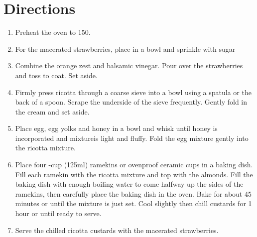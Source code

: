 \section*{Directions}
\begin{enumerate}
	\item Preheat the oven to 150\textcelsius.
	\item  For the macerated strawberries, place in a bowl and sprinkle with sugar
	\item Combine the orange zest and balsamic vinegar. Pour over the strawberries and toss to coat. Set aside.
	\item Firmly press ricotta through a coarse sieve into a bowl using a spatula or the back of a spoon.
		Scrape the underside of the sieve frequently. Gently fold in the cream and set aside.
	\item Place egg, egg yolks and honey in a bowl and whisk until honey is incorporated and mixtureis light and fluffy.
			Fold the egg mixture gently into the ricotta mixture.
	\item Place four -cup (125ml) ramekins or ovenproof ceramic cups in a baking dish.
			Fill each ramekin with the ricotta mixture and top with the almonds.
			Fill the baking dish with enough boiling water to come halfway up the sides of the ramekins, then carefully place the baking dish in the oven.
			Bake for about 45 minutes or until the mixture is just set. Cool slightly then chill custards for 1 hour or until ready to serve.
	\item Serve the chilled ricotta custards with the macerated strawberries.
\end{enumerate}




